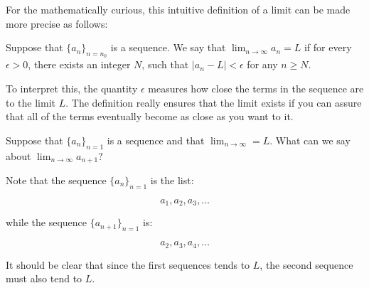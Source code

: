 \documentclass{ximera}
\begin{document}
For the mathematically curious, this intuitive definition of a limit can be made more precise as follows:

\begin{definition}
\label{definition:limit-of-a-sequence}
Suppose that $\{a_n\}_{n=n_0}$ is a sequence.  We say that
$\lim_{n\to \infty}a_n=L$ if for every $\epsilon>0$, there exists an integer $N$, such that $|a_n-L|<\epsilon$ for any $n \geq N$.
\end{definition}

To interpret this, the quantity $\epsilon$ measures how close the terms in the sequence are to the limit $L$.  The definition really ensures that  the limit exists if you can assure that all of the terms eventually become as close as you want to it.  

\begin{question}
Suppose that $\{a_n\}_{n=1}$ is a sequence and that $\lim_{n \to \infty} = L$.  What can we say about $\lim_{n \to \infty} a_{n+1}$?
\begin{multipleChoice}
\end{multipleChoice}

\begin{feedback}
Note that the sequence $\{a_n\}_{n=1}$ is the list:

\[
a_1,a_2,a_3, \ldots
\]

while the sequence $\{a_{n+1}\}_{n=1}$ is:

\[
a_2,a_3,a_4, \ldots
\]

It should be clear that since the first sequences tends to $L$, the second sequence must also tend to $L$.
\end{feedback}

\end{question}
\end{document}
